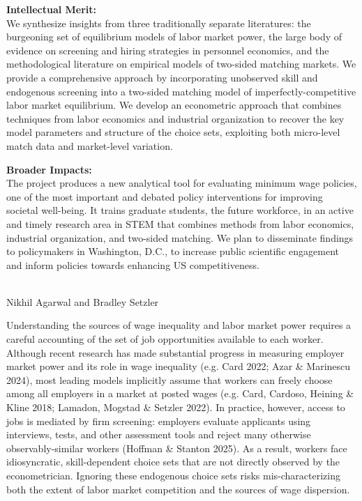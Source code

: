\documentclass[11pt]{article}
\begin{document}
\medskip
\noindent
\textbf{Intellectual Merit:}\\ We synthesize insights from three traditionally separate literatures: the burgeoning set of equilibrium models of labor market power, the large body of evidence on screening and hiring strategies in personnel economics, and the methodological literature on empirical models of two-sided matching markets. We provide a comprehensive approach by incorporating unobserved skill and endogenous screening into a two-sided matching model of imperfectly-competitive labor market equilibrium. We develop an econometric approach that combines techniques from labor economics and industrial organization to recover the key model parameters and structure of the choice sets, exploiting both micro-level match data and market-level variation.

\medskip
\noindent
\textbf{Broader Impacts:}\\ The project produces a new analytical tool for evaluating minimum wage policies, one of the most important and debated policy interventions for improving societal well-being. It trains graduate students, the future workforce, in an active and timely research area in STEM that combines methods from labor economics, industrial organization, and two-sided matching. We plan to disseminate findings to policymakers in Washington, D.C., to increase public scientific engagement and inform policies towards enhancing US competitiveness. 
\thispagestyle{empty}\addtocounter{page}{-1}
\pagebreak

\begin{center}
{ \\
Nikhil Agarwal and Bradley Setzler}

\end{center}

Understanding the sources of wage inequality and labor market power requires a careful accounting of the set of job opportunities available to each worker.  Although recent research has made substantial progress in measuring employer market power and its role in wage inequality (e.g. Card 2022; Azar \& Marinescu 2024), most leading models implicitly assume that workers can freely choose among all employers in a market at posted wages (e.g. Card, Cardoso, Heining \& Kline 2018; Lamadon, Mogstad \& Setzler 2022). In practice, however, access to jobs is mediated by firm screening: employers evaluate applicants using interviews, tests, and other assessment tools and reject many otherwise observably-similar workers (Hoffman \& Stanton 2025). As a result, workers face idiosyncratic, skill-dependent choice sets that are not directly observed by the econometrician. Ignoring these endogenous choice sets risks mis-characterizing both the extent of labor market competition and the sources of wage dispersion.
\end{document}

